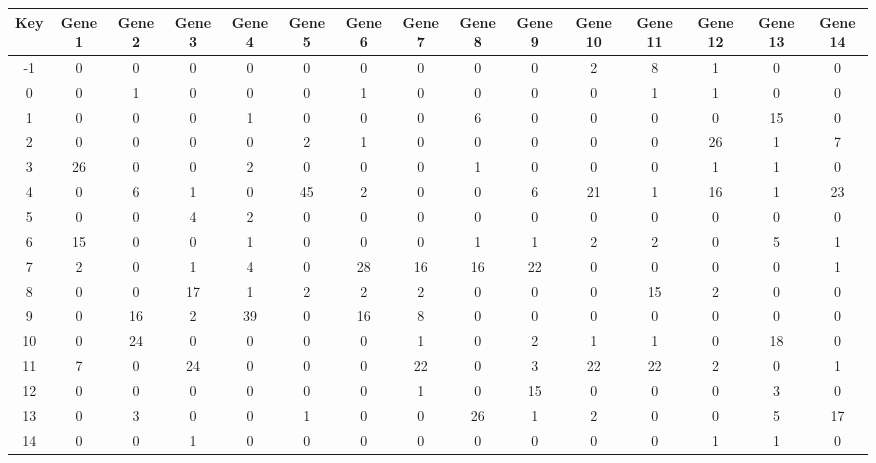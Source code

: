 \begin{tabular}{|c|c|c|c|c|c|c|c|c|c|c|c|c|c|c|}
\hline
Key & Gene 1 & Gene 2 & Gene 3 & Gene 4 & Gene 5 & Gene 6 & Gene 7 & Gene 8 & Gene 9 & Gene 10 & Gene 11 & Gene 12 & Gene 13 & Gene 14 \\
\hline
-1 & 0 & 0 & 0 & 0 & 0 & 0 & 0 & 0 & 0 & 2 & 8 & 1 & 0 & 0 \\
0 & 0 & 1 & 0 & 0 & 0 & 1 & 0 & 0 & 0 & 0 & 1 & 1 & 0 & 0 \\
1 & 0 & 0 & 0 & 1 & 0 & 0 & 0 & 6 & 0 & 0 & 0 & 0 & 15 & 0 \\
2 & 0 & 0 & 0 & 0 & 2 & 1 & 0 & 0 & 0 & 0 & 0 & 26 & 1 & 7 \\
3 & 26 & 0 & 0 & 2 & 0 & 0 & 0 & 1 & 0 & 0 & 0 & 1 & 1 & 0 \\
4 & 0 & 6 & 1 & 0 & 45 & 2 & 0 & 0 & 6 & 21 & 1 & 16 & 1 & 23 \\
5 & 0 & 0 & 4 & 2 & 0 & 0 & 0 & 0 & 0 & 0 & 0 & 0 & 0 & 0 \\
6 & 15 & 0 & 0 & 1 & 0 & 0 & 0 & 1 & 1 & 2 & 2 & 0 & 5 & 1 \\
7 & 2 & 0 & 1 & 4 & 0 & 28 & 16 & 16 & 22 & 0 & 0 & 0 & 0 & 1 \\
8 & 0 & 0 & 17 & 1 & 2 & 2 & 2 & 0 & 0 & 0 & 15 & 2 & 0 & 0 \\
9 & 0 & 16 & 2 & 39 & 0 & 16 & 8 & 0 & 0 & 0 & 0 & 0 & 0 & 0 \\
10 & 0 & 24 & 0 & 0 & 0 & 0 & 1 & 0 & 2 & 1 & 1 & 0 & 18 & 0 \\
11 & 7 & 0 & 24 & 0 & 0 & 0 & 22 & 0 & 3 & 22 & 22 & 2 & 0 & 1 \\
12 & 0 & 0 & 0 & 0 & 0 & 0 & 1 & 0 & 15 & 0 & 0 & 0 & 3 & 0 \\
13 & 0 & 3 & 0 & 0 & 1 & 0 & 0 & 26 & 1 & 2 & 0 & 0 & 5 & 17 \\
14 & 0 & 0 & 1 & 0 & 0 & 0 & 0 & 0 & 0 & 0 & 0 & 1 & 1 & 0 \\
\hline
\end{tabular}